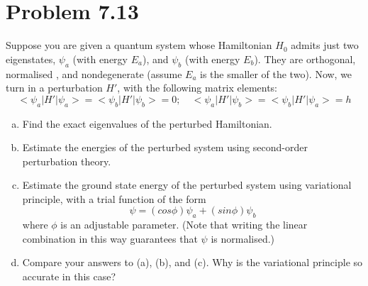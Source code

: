 \documentclass[12 pt]{article}
\numberwithin{equation}{section}
\begin{document}
\section{Problem 7.13}
Suppose you are given a quantum system whose Hamiltonian $H_0$ admits just two eigenstates, 
$\psi_a$ (with energy $E_a$), and $\psi_b$ (with energy $E_b$). They are orthogonal, normalised 
, and nondegenerate (assume $E_a$ is the smaller of the two). Now, we turn in a perturbation $H'$,
with the following matrix elements: 
\begin{equation}\label{eq31}
\big<\psi_a\big|H'\big|\psi_a\big> =\big<\psi_b\big|H'\big|\psi_b\big> =0 ;
\quad \big<\psi_a\big|H'\big|\psi_b\big> = \big<\psi_b\big|H'\big|\psi_a\big> = h
\end{equation}
\begin{enumerate}[a)]
  \item Find the exact eigenvalues of the perturbed Hamiltonian.
  \item Estimate the energies of the perturbed system using second-order perturbation theory.
  \item Estimate the ground state energy of the perturbed system using variational principle, 
    with a trial function of the form
    \begin{equation}\label{eq32}
    \psi = (cos\phi)\psi_a + (sin\phi)\psi_b
    \end{equation}
    where $\phi$ is an adjustable parameter. (Note that writing the linear combination in this way
    guarantees that $\psi$ is normalised.)
  \item Compare your answers to (a), (b), and (c). Why is the variational principle so accurate in
    this case?
\end{enumerate}
\end{document}
